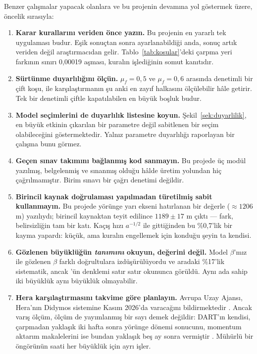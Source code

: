\documentclass[12pt,a4paper]{article}
\begin{document}
Benzer çalışmalar yapacak olanlara ve bu projenin devamına yol göstermek
üzere, öncelik sırasıyla:

\begin{enumerate}[leftmargin=9mm,itemsep=2pt,topsep=3pt]
\item \textbf{Karar kurallarını veriden önce yazın.} Bu projenin en
      yararlı tek uygulaması budur. Eşik sonuçtan sonra ayarlanabildiği
      anda, sonuç artık veriden değil araştırmacıdan gelir.
      Tablo~\ref{tab:kosular}'deki çarpma yeri farkının sınırı 0,00019
      aşması, kuralın işlediğinin somut kanıtıdır.

\item \textbf{Sürtünme duyarlılığını ölçün.} $\mu_f=0{,}5$ ve
      $\mu_f=0{,}6$ arasında denetimli bir çift koşu,
      \citet{senel2025} ile karşılaştırmanın şu anki en zayıf halkasını
      ölçülebilir hâle getirir. Tek bir denetimli çiftle kapatılabilen en
      büyük boşluk budur.

\item \textbf{Model seçimlerini de duyarlılık listesine koyun.}
      Şekil~\ref{sek:duyarlilik}, en büyük etkinin çıkarılan bir
      parametre değil sabitlenen bir seçim olabileceğini göstermektedir.
      Yalnız parametre duyarlılığı raporlayan bir çalışma bunu görmez.

\item \textbf{Geçen sınav takımını bağlanmış kod sanmayın.} Bu projede
      üç modül yazılmış, belgelenmiş ve sınanmış olduğu hâlde üretim
      yolundan hiç çağrılmamıştır. Birim sınavı bir çağrı denetimi
      değildir.

\item \textbf{Birincil kaynak doğrulaması yapılmadan türetilmiş sabit
      kullanmayın.} Bu projede yörünge yarı ekseni hatırlanan bir
      değerle ($\approx1206$ m) yazılıydı; birincil kaynaktan teyit
      edilince $1189\pm17$ m çıktı --- fark, belirsizliğin tam bir katı.
      Kaçış hızı $a^{-1/2}$ ile gittiğinden bu \%0,7'lik bir kayma
      yapardı: küçük, ama kuralın engellemek için konduğu şeyin ta
      kendisi.

\item \textbf{Gözlenen büyüklüğün \emph{tanımını} okuyun, değerini
      değil.} Model $\beta$'mız ile gözlenen $\beta$ farklı
      doğrultulara izdüşürülüyordu ve aradaki \%17'lik sistematik, ancak
      \citet{cheng2023}'ün denklemi satır satır okununca görüldü. Aynı
      ada sahip iki büyüklük aynı büyüklük olmayabilir.

\item \textbf{Hera karşılaştırmasını takvime göre planlayın.} Avrupa
      Uzay Ajansı, Hera'nın Didymos sistemine Kasım 2026'da varacağını
      bildirmektedir \citep{esaHera}. Ancak varış ölçüm, ölçüm de
      yayımlanmış bir sayı demek değildir: DART'ın kendisi, çarpmadan
      yaklaşık iki hafta sonra yörünge dönemi sonucunu, momentum aktarım
      makalelerini ise bundan yaklaşık beş ay sonra vermiştir
      \citep{cheng2023}. Mühürlü bir öngörünün saati her büyüklük için
      ayrı işler.
\end{enumerate}
\end{document}
